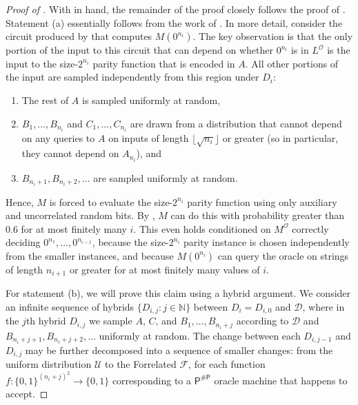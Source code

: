 \documentclass[11pt]{article}%
\newcommand{\Naturals}{\mathbb{N}}
\begin{document}
\begin{proof}[Proof of ]
With  in hand, the remainder of the proof closely follows the proof of . Statement (a) essentially follows from the work of \cite{Has87}.  In more detail, consider the circuit produced by  that computes $M\left(0^{n_i}\right)$. The key observation is that the only portion of the input to this circuit that can depend on whether $0^{n_i}$ is in $L^\mathcal{O}$ is the input to the size-$2^{n_i}$ parity function that is encoded in $A$. All other portions of the input are sampled independently from this region under $D_i$:
\begin{enumerate}
\item The rest of $A$ is sampled uniformly at random,
\item $B_1,\ldots,B_{n_i}$ and $C_1,\ldots,C_{n_i}$ are drawn from a distribution that cannot depend on any queries to $A$ on inputs of length $\lfloor \sqrt{n_i} \rfloor$ or greater (so in particular, they cannot depend on $A_{n_i}$), and
\item $B_{n_i+1}, B_{n_i + 2},\ldots$ are sampled uniformly at random.
\end{enumerate}
Hence, $M$ is forced to evaluate the size-$2^{n_i}$ parity function using only auxiliary and uncorrelated random bits. By , $M$ can do this with probability greater than 0.6 for at most finitely many $i$. This even holds conditioned on $M^\mathcal{O}$ correctly deciding $0^{n_1},\dots,0^{n_{i-1}}$, because the size-$2^{n_i}$ parity instance is chosen independently from the smaller instances, and because $M\left(0^{n_i}\right)$ can query the oracle on strings of length $n_{i+1}$ or greater for at most finitely many values of $i$.

For statement (b), we will prove this claim using a hybrid argument. We consider an infinite sequence of hybrids $\{D_{i,j} : j \in \Naturals\}$ between $D_i = D_{i,0}$ and $\mathcal{D}$, where in the $j$th hybrid $D_{i,j}$ we sample $A$, $C$, and $B_1,\ldots,B_{n_i + j}$ according to $\mathcal{D}$ and $B_{n_i + j + 1}, B_{n_i + j+2}, \ldots$ uniformly at random. The change between each $D_{i,j-1}$ and $D_{i,j}$ may be further decomposed into a sequence of smaller changes: from the uniform distribution $\mathcal{U}$ to the Forrelated $\mathcal{F}$, for each function $f: \{0,1\}^{(n_i + j)^2} \to \{0,1\}$ corresponding to a $\mathsf{P^{\# P}}$ oracle machine that happens to accept. 


\end{proof}
\end{document}
